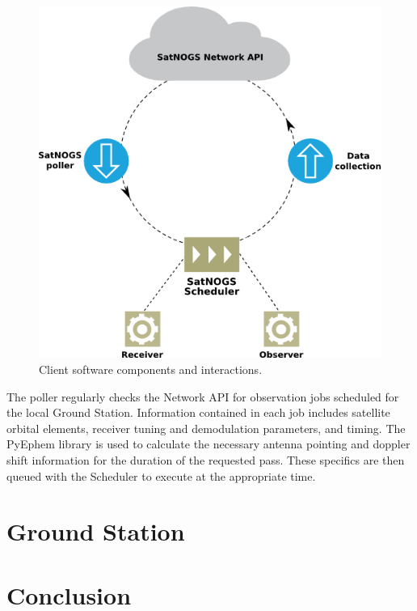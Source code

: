 \documentclass[conference]{IEEEtran}
\begin{document}
\begin{figure}[htbp]
\centering
\includegraphics[width=\columnwidth]{fig/client-flow}
\caption{Client software components and interactions.}
\label{f:client-flow}
\end{figure}

The poller regularly checks the Network API for observation jobs scheduled for the local Ground Station.
Information contained in each job includes satellite orbital elements, receiver tuning and demodulation parameters, and timing.
The PyEphem \cite{PyEphem} library is used to calculate the necessary antenna pointing and doppler shift information for the duration of the requested pass.
These specifics are then queued with the Scheduler to execute at the appropriate time.



\section{Ground Station}

\section{Conclusion}


\end{document}
